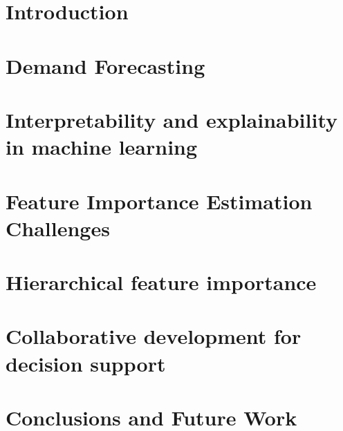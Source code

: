 
\chapter{Introduction}\label{ch:introduction}
%



\chapter{Demand Forecasting}
\label{ch:demand_forecasting}


\chapter{Interpretability and explainability in machine learning}
\label{ch:interpretability_explainability}



\chapter{Feature Importance Estimation Challenges}
\label{sec:feature_importance_estimation}



\chapter{Hierarchical feature importance}
\label{ch:hierarchical_feature_importance}


\chapter{Collaborative development for decision support}
\label{ch:collaborative_development}




\chapter{Conclusions and Future Work}
\label{ch:conclusions}


